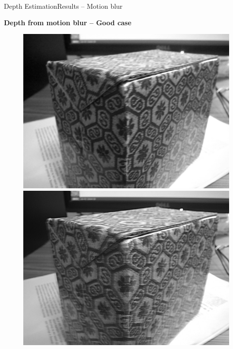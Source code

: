 \documentclass{beamer}
\begin{document}
\begin{frame}{Depth Estimation}{Results -- Motion blur}

\textbf{Depth from motion blur -- Good case}

\begin{figure}[H]
\begin{center}
\resizebox{30mm}{!} {\includegraphics {../images/depth/eg1/preview_im_gray.png}}
\resizebox{30mm}{!} {\includegraphics {../images/depth/eg1/saved_im_gray.png}}

\end{center}
\end{figure}
\end{frame}
\end{document}
